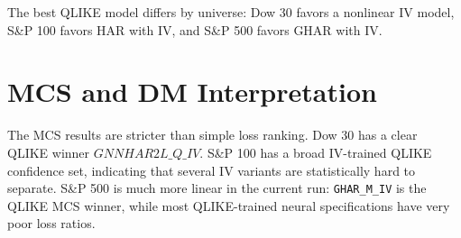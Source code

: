 \documentclass[11pt,a4paper]{article}
\begin{document}
\begin{table}[H]
\centering
\caption{Best models by universe and evaluation loss}
\label{tab:best-models}
\scriptsize
{}

\vspace{2pt}\begin{minipage}{0.98\textwidth}\footnotesize The best QLIKE model differs by universe: Dow 30 favors a nonlinear IV model, S\&P 100 favors HAR with IV, and S\&P 500 favors GHAR with IV.\end{minipage}
\end{table}

\section{MCS and DM Interpretation}

The MCS results are stricter than simple loss ranking.  Dow 30 has a clear QLIKE winner \(GNNHAR2L\_Q\_IV\).  S\&P 100 has a broad IV-trained QLIKE confidence set, indicating that several IV variants are statistically hard to separate.  S\&P 500 is much more linear in the current run: \texttt{GHAR\_M\_IV} is the QLIKE MCS winner, while most QLIKE-trained neural specifications have very poor loss ratios.
\end{document}
